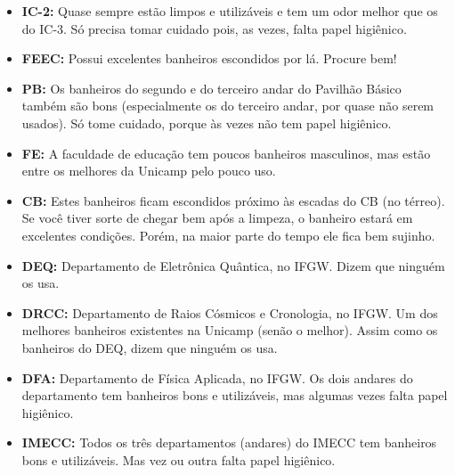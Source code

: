 \begin{itemize}
\item  \textbf{IC-2:} Quase sempre estão limpos e utilizáveis e tem um odor melhor que os do IC-3. Só precisa tomar cuidado pois, as vezes, falta papel higiênico.
\end{itemize}

\begin{itemize}
\item  \textbf{FEEC:} Possui excelentes banheiros escondidos por lá. Procure bem!
\end{itemize}

\begin{itemize}
\item  \textbf{PB:} Os banheiros do segundo e do terceiro andar do Pavilhão Básico também são bons (especialmente os do terceiro andar, por quase não serem usados). Só tome cuidado, porque às vezes não tem papel higiênico.
\end{itemize}

\begin{itemize}
\item  \textbf{FE:} A faculdade de educação tem poucos banheiros masculinos, mas estão entre os melhores da Unicamp pelo pouco uso.
\end{itemize}

\begin{itemize}
\item  \textbf{CB:} Estes banheiros ficam escondidos próximo às escadas do CB (no térreo). Se você tiver sorte de chegar bem após a limpeza, o banheiro estará em excelentes condições. Porém, na maior parte do tempo ele fica bem sujinho.
\end{itemize}

\begin{itemize}
\item  \textbf{DEQ:} Departamento de Eletrônica Quântica, no IFGW. Dizem que ninguém os usa.
\end{itemize}

\begin{itemize}
\item  \textbf{DRCC:} Departamento de Raios Cósmicos e Cronologia, no IFGW. Um dos melhores banheiros existentes na Unicamp (senão o melhor). Assim como os banheiros do DEQ, dizem que ninguém os usa.
\end{itemize}

\begin{itemize}
\item  \textbf{DFA:} Departamento de Física Aplicada, no IFGW. Os dois andares do departamento tem banheiros bons e utilizáveis, mas algumas vezes falta papel higiênico.
\end{itemize}

\begin{itemize}
\item  \textbf{IMECC:} Todos os três departamentos (andares) do IMECC tem banheiros bons e utilizáveis. Mas vez ou outra falta papel higiênico.
\end{itemize}
